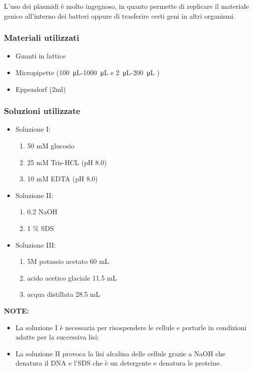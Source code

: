 L'uso dei plasmidi è molto ingegnoso, in quanto permette di replicare il materiale genico all'interno dei batteri
oppure di trasferire certi geni in altri organismi.


\subsubsection{Materiali utilizzati}

\begin{itemize}
	\item Guanti in lattice
	\item Micropipette (\SI{100}{\micro\liter}-\SI{1000}{\micro\liter} e \SI{2}{\micro\liter}-\SI{200}{\micro\liter}  )
	\item Eppendorf (2ml)
\end{itemize}


\subsubsection{Soluzioni utilizzate}

\begin{itemize}

	\item Soluzione I:
  \begin{enumerate}
    \item 50 mM glucosio
    \item 25 mM Tris-HCL (pH 8.0)
    \item 10 mM EDTA (pH 8.0)
  \end{enumerate}
	\item Soluzione II:
  \begin{enumerate}
    \item 0.2 NaOH
    \item 1 \% SDS
  \end{enumerate}
	\item Soluzione III:
  \begin{enumerate}
    \item 5M potassio acetato 60 mL
    \item acido acetico glaciale 11.5 mL
    \item acqua distillata 28.5 mL
  \end{enumerate}

\end{itemize}

\vspace{0.5cm}

\textbf{NOTE:}
\begin{itemize}
  \item La soluzione I è necessaria per risospendere le cellule e portarle in condizioni
	adatte per la successiva lisi;
  \item La soluzione II provoca la lisi alcalina delle cellule grazie a NaOH che denatura
	il DNA e l’SDS che è un detergente e denatura le proteine.
\end{itemize}


